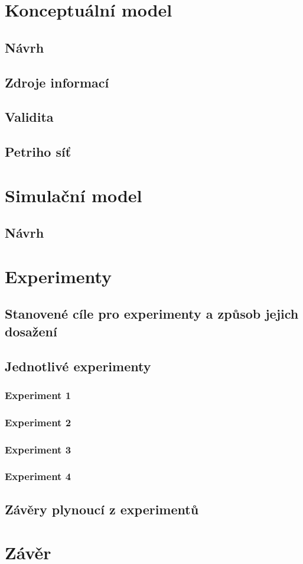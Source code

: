 \documentclass[a4paper,11pt,titlepage]{article}
\begin{document}
\section{Konceptuální model}



\subsection{Návrh}
\subsection{Zdroje informací}
\subsection{Validita}
\subsection{Petriho síť}
\section{Simulační model}
\subsection{Návrh}
\section{Experimenty}
\subsection{Stanovené cíle pro experimenty a způsob jejich dosažení}
\subsection{Jednotlivé experimenty}
\subsubsection{Experiment 1}
\subsubsection{Experiment 2}
\subsubsection{Experiment 3}
\subsubsection{Experiment 4}
\subsection{Závěry plynoucí z experimentů}
\section{Závěr}

\newpage

\nocite{*}




\newpage
\thispagestyle{empty}
\end{document}
